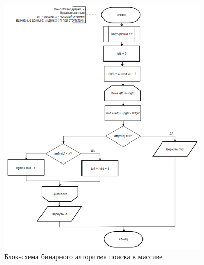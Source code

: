 \begin{figure}[H]
    \centering
    \includegraphics[width=0.9\textwidth]{img/block_2.png}
    \caption{Блок-схема бинарного алгоритма поиска в массиве}
    \label{fig:block_2}
\end{figure}

\newpage